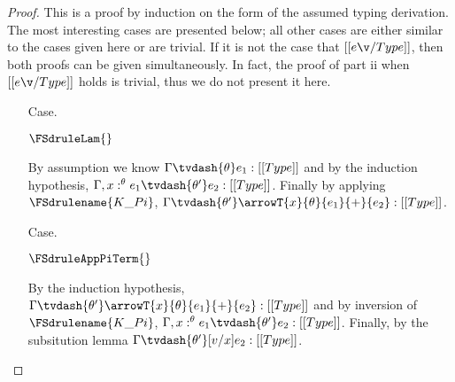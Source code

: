 \begin{proof}
  This is a proof by induction on the form of the assumed typing
  derivation.  The most interesting cases are presented below; all
  other cases are either similar to the cases given here or are
  trivial.  If it is not the case that $[[e \v/ Type]]$, then both
  proofs can be given simultaneously.  In fact, the proof of part ii
  when $[[e \v/ Type]]$ holds is trivial, thus we do not present it
  here.
  
  \begin{itemize}

  \item[Case.] \ \\
    \begin{center}
      $\FSdruleLam{}$
    \end{center}
    By assumption we know $\Gamma \tvdash{\theta} e_1:[[Type]]$ and by the induction hypothesis,
    $\Gamma,x:^\theta e_1 \tvdash{\theta'} e_2:[[Type]]$. Finally by applying 
    $\FSdrulename{K\_Pi}$, $\Gamma \tvdash{\theta'} \arrowT{x}{\theta}{e_1}{+}{e_2}:[[Type]]$.


  \item[Case.] \ \\
    \begin{center}
      $\FSdruleAppPiTerm{}$
    \end{center}
    By the induction hypothesis, $\Gamma \tvdash{\theta'} \arrowT{x}{\theta}{e_1}{+}{e_2}:[[Type]]$
    and by inversion of $\FSdrulename{K\_Pi}$, $\Gamma, x:^\theta e_1 \tvdash{\theta'} e_2:[[Type]]$.
    Finally, by the subsitution lemma $\Gamma \tvdash{\theta'} [v/x]e_2:[[Type]]$.



\end{itemize}
\end{proof}
